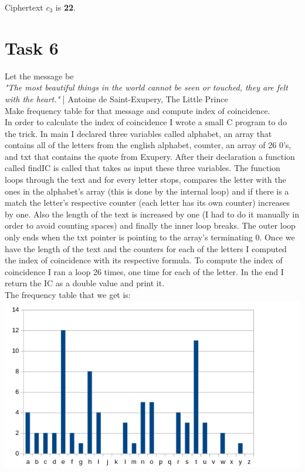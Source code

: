 \documentclass[12pt]{article}
\begin{document}
\noindent Ciphertext $c_3$ is \textbf{22}.


\section*{Task 6}

Let the message be \\

\noindent \textit{"The most beautiful things in the world cannot be seen or touched, 
they are felt with the heart."} | Antoine de Saint-Exupery, The Little Prince \\

\noindent Make frequency table for that message and compute index of coincidence. \\

\noindent  In order to calculate the index of coincidence I wrote a small C program to do 
the trick. In main I declared three variables called alphabet, an array that contains all of 
the letters from the english alphabet, counter, an array of 26 0's, and txt that contains
the quote from Exupery. After their declaration a function called findIC is called that 
takes as input these three variables. The function loops through the text and for every letter stops,
compares the letter with the ones in the alphabet's array (this is done by the internal loop) and if there 
is a match the letter's respective counter (each letter has its own counter) increases by one. 
Also the length of the text is increased by one (I had to do it
manually in order to avoid counting spaces) and  finally the inner loop breaks. The outer loop only
ends when the txt pointer is pointing to the array's terminating 0. Once we have 
the length of the text and the counters for each of the letters I computed the index 
of coincidence with its respective formula. To compute the index of coincidence I ran a loop 
26 times, one time for each of the letter. In the end I return the IC as a double value and
print it. \\

\noindent The frequency table that we get is:  \\

\noindent \includegraphics[scale=0.5]{frequency_table} \\
\end{document}
